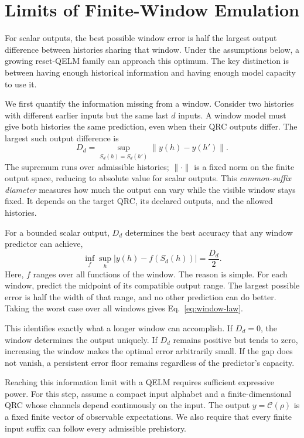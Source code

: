\section{Limits of Finite-Window Emulation}
\label{sec:criterion}

For scalar outputs, the best possible window error is half the largest
output difference between histories sharing that window.
Under the assumptions below, a growing reset-QELM family can approach this
optimum. The key distinction is between having enough historical information
and having enough model capacity to use it.

We first quantify the information missing from a window. Consider two
histories with different earlier inputs but the same last $d$ inputs.
A window model must give both histories the same prediction, even when their
QRC outputs differ. The largest such output difference is
\begin{equation}
 D_d=\sup_{S_d(h)=S_d(h')}\|y(h)-y(h')\|.
 \label{eq:diameter}
\end{equation}
The supremum runs over admissible histories; $\|\cdot\|$ is a fixed norm on
the finite output space, reducing to absolute value for scalar outputs.
This \emph{common-suffix diameter}
measures how much the output can vary while the visible window stays fixed.
It depends on the target QRC, its declared outputs, and the allowed histories.

For a bounded scalar output, $D_d$ determines the best accuracy that any
window predictor can achieve,
\begin{equation}
 \inf_f\sup_h |y(h)-f(S_d(h))|=\frac{D_d}{2}.
 \label{eq:window-law}
\end{equation}
Here, $f$ ranges over all functions of the window. The reason is simple.
For each window, predict the midpoint of its compatible output range.
The largest possible error is half the width of that range, and no other
prediction can do better. Taking the worst case over all windows gives
Eq.~\eqref{eq:window-law}.

This identifies exactly what a longer window can accomplish. If $D_d=0$,
the window determines the output uniquely. If $D_d$ remains positive but
tends to zero, increasing the window makes the optimal error arbitrarily
small. If the gap does not vanish, a persistent error floor remains
regardless of the predictor's capacity.

Reaching this information limit with a QELM requires sufficient expressive
power. For this step, assume a compact input alphabet and a finite-dimensional
QRC whose channels depend continuously on the input. The output
$y=\mathcal C(\rho)$ is a fixed finite vector of observable expectations.
We also require that every finite input suffix can follow every admissible
prehistory.

